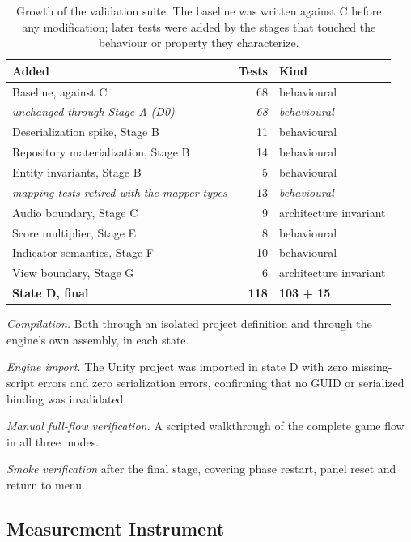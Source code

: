 \documentclass[pdflatex,sn-basic]{sn-jnl}
\begin{document}
\begin{table}[!htbp]
\centering
\caption{Growth of the validation suite. The baseline was written against C before any modification; later tests were added by the stages that touched the behaviour or property they characterize.}\label{tab:suite}
\small
\begin{tabular}{@{}p{}r p{}@{}}
\toprule
\textbf{Added} & \textbf{Tests} & \textbf{Kind} \\
\midrule
Baseline, against C            & 68  & behavioural \\
\quad \emph{unchanged through Stage A (D0)} & \emph{68} & \emph{behavioural} \\
\addlinespace
Deserialization spike, Stage B & 11  & behavioural \\
Repository materialization, Stage B & 14 & behavioural \\
Entity invariants, Stage B     & 5   & behavioural \\
\quad \emph{mapping tests retired with the mapper types} & \emph{$-13$} & \emph{behavioural} \\
Audio boundary, Stage C        & 9   & architecture invariant \\
Score multiplier, Stage E      & 8   & behavioural \\
Indicator semantics, Stage F   & 10  & behavioural \\
View boundary, Stage G         & 6   & architecture invariant \\
\midrule
\textbf{State D, final}        & \textbf{118} & \textbf{103 + 15} \\
\bottomrule
\end{tabular}
\end{table}

\emph{Compilation.} Both through an isolated project definition and through the engine's own assembly, in each state.

\emph{Engine import.} The Unity project was imported in state D with zero missing-script errors and zero serialization errors, confirming that no GUID or serialized binding was invalidated.

\emph{Manual full-flow verification.} A scripted walkthrough of the complete game flow in all three modes.

\emph{Smoke verification} after the final stage, covering phase restart, panel reset and return to menu.

\subsection{Measurement Instrument}
\end{document}
